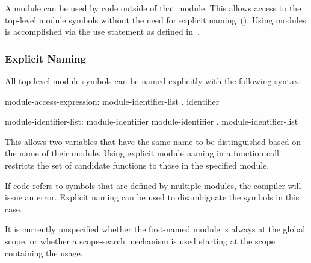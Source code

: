 A module can be used by code outside of that module.  This allows
access to the top-level module symbols without the need for explicit
naming~().  Using modules is accomplished via
the use statement as defined in~.

\subsubsection{Explicit Naming}
\label{Explicit_Naming}

All top-level module symbols can be named explicitly with the
following syntax:
\begin{syntax}
module-access-expression:
  module-identifier-list . identifier

module-identifier-list:
  module-identifier
  module-identifier . module-identifier-list

\end{syntax}
This allows two variables that have the same name to be distinguished
based on the name of their module.  Using explicit module naming in a
function call restricts the set of candidate functions to those in the
specified module.

If code refers to symbols that are defined by multiple modules, the
compiler will issue an error.  Explicit naming can be used to
disambiguate the symbols in this case.

\begin{openissue}
It is currently unspecified whether the
first-named module is always at the global scope, or whether a
scope-search mechanism is used starting at the scope containing the
usage.
\end{openissue}

